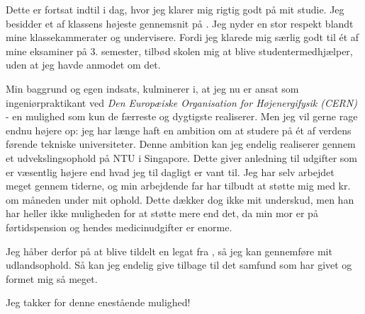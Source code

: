\documentclass[../Ansoegning.tex]{subfiles}
\begin{document}
Dette er fortsat indtil i dag, hvor jeg klarer mig rigtig godt på mit studie. Jeg besidder et af
klassens højeste gennemsnit på \avgKar. Jeg nyder en stor respekt blandt mine klassekammerater
og undervisere. Fordi jeg klarede mig særlig godt til ét af mine eksaminer på 3. semester,
tilbød skolen mig at blive studentermedhjælper, uden at jeg havde anmodet om det.

Min baggrund og egen indsats, kulminerer i, at jeg nu er ansat som ingeniørpraktikant ved \textit{Den Europæiske Organisation for Højenergifysik (CERN)} - en mulighed som kun de færreste og dygtigste realiserer. Men jeg vil gerne rage endnu højere op: jeg har længe haft en ambition om at studere på ét af verdens førende tekniske universiteter. Denne ambition kan jeg endelig realiserer gennem et udvekslingsophold på NTU i Singapore. Dette giver anledning til udgifter som er væsentlig højere end hvad jeg til dagligt er vant til. Jeg har selv arbejdet meget gennem tiderne, og min
arbejdende far har tilbudt at støtte mig med \FamSupp kr. om måneden under mit ophold.
Dette dækker dog ikke mit underskud, men han har heller ikke muligheden for at støtte
mere end det, da min mor er på førtidspension og hendes medicinudgifter er enorme.

Jeg håber derfor på at blive tildelt en legat fra \FondNavn, så jeg kan
gennemføre mit udlandsophold. Så kan jeg endelig give tilbage til det samfund som har givet
og formet mig så meget.

Jeg takker {\FondNavn } for denne enestående mulighed!
\end{document}
